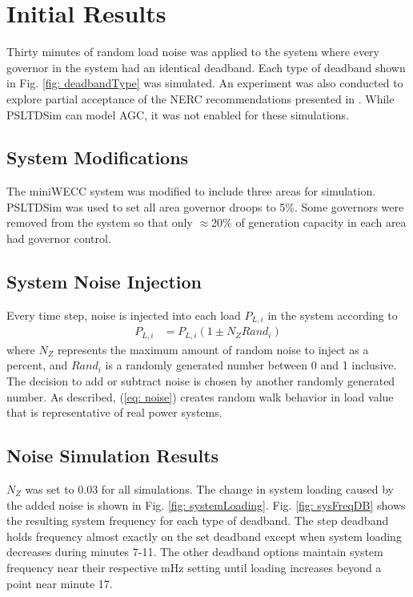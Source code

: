 \section{Initial Results}
Thirty minutes of random load noise was applied to the system where every governor in the system had an identical deadband.
Each type of deadband shown in Fig. \ref{fig: deadbandType} was simulated.
An experiment was also conducted to explore partial acceptance of the NERC recommendations presented in \cite{nercFRI2012}.
While PSLTDSim can model AGC, it was not enabled for these simulations.


\subsection{System Modifications}
The miniWECC system was modified to include three areas for simulation.
PSLTDSim was used to set all area governor droops to 5\%.
Some governors were removed from the system so that only $\approx$20\% of generation capacity in each area had governor control.

\subsection{System Noise Injection}
Every time step, noise is injected into each load $P_{L,i}$ in the system according to
\begin{align}
P_{L,i} &= P_{L,i}(1 \pm N_Z Rand_i) \label{eq: noise}
\end{align}
where $N_Z$ represents the maximum amount of random noise to inject as a percent,
and $Rand_i$ is a randomly generated number between 0 and 1 inclusive.
The decision to add or subtract noise is chosen by another randomly generated number.
As described, (\ref{eq: noise}) creates random walk behavior in load value that is representative of real power systems\cite{AGCCresap}.


\subsection{Noise Simulation Results}

$N_Z$ was set to 0.03 for all simulations. 
The change in system loading caused by the added noise is shown in Fig. \ref{fig: systemLoading}.
Fig. \ref{fig: sysFreqDB} shows the resulting system frequency for each type of deadband.
The step deadband holds frequency almost exactly on the set deadband except when system loading decreases during minutes 7-11.
The other deadband options maintain system frequency near their respective mHz setting until loading increases beyond a point near minute 17.


